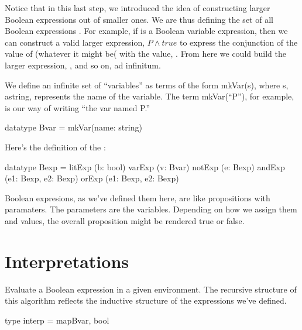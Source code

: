 \documentclass[letterpaper,10pt,english]{sphinxmanual}
\begin{document}
Notice that in this last step, we introduced the idea of constructing
larger Boolean expressions out of smaller ones. We are thus defining
the set of all Boolean expressions . For example, if 
is a Boolean variable expression, then we can construct a valid larger
expression, \(P \land true\) to express the conjunction of the
value of  (whatever it might be( with the value, . From here
we could build the larger expression, , and so
on, ad infinitum.

We define an infinite set of “variables” as terms of the form
mkVar(s), where s, astring, represents the name of the variable. The
term mkVar(“P”), for example, is our way of writing “the var named P.”

\begin{sphinxVerbatim}[commandchars=\\\{\}]
datatype Bvar = mkVar(name: string)
\end{sphinxVerbatim}

Here’s the definition of the :

\begin{sphinxVerbatim}[commandchars=\\\{\}]
datatype Bexp =
    litExp (b: bool) \textbar{}
    varExp (v: Bvar) \textbar{}
    notExp (e: Bexp) \textbar{}
    andExp (e1: Bexp, e2: Bexp) \textbar{}
    orExp (e1: Bexp, e2: Bexp)
\end{sphinxVerbatim}

Boolean expresions, as we’ve defined them here, are like propositions
with paramaters. The parameters are the variables. Depending on how we
assign them  and  values, the overall proposition might be
rendered true or false.


\section{Interpretations}
\label{\detokenize{08-propositional-logic:interpretations}}
Evaluate a Boolean expression in a given environment.  The recursive
structure of this algorithm reflects the inductive structure of the
expressions we’ve defined.

\begin{sphinxVerbatim}[commandchars=\\\{\}]
type interp = map\PYGZlt{}Bvar, bool\PYGZgt{}
\end{sphinxVerbatim}
\end{document}
